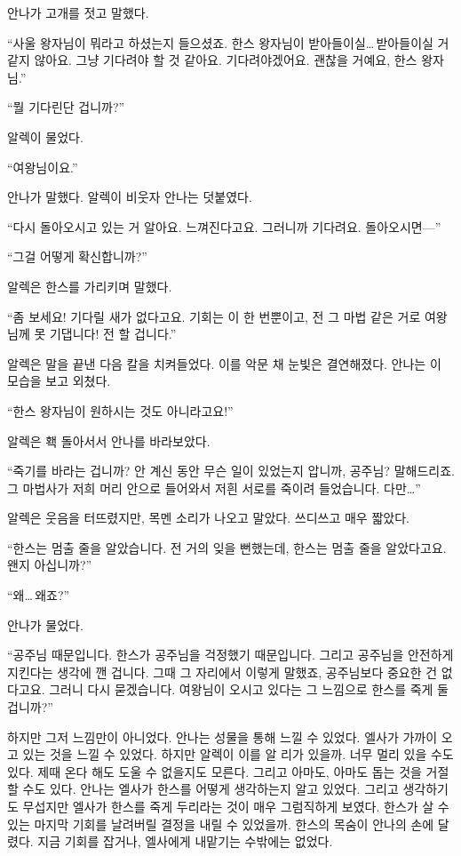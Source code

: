 안나가 고개를 젓고 말했다.

``사울 왕자님이 뭐라고 하셨는지 들으셨죠. 한스 왕자님이 받아들이실\ldots\,받아들이실 거 같지 않아요. 그냥 기다려야 할 것 같아요. 기다려야겠어요. 괜찮을 거예요, 한스 왕자님.''

``뭘 기다린단 겁니까?''

알렉이 물었다.

``여왕님이요.''

안나가 말했다. 알렉이 비웃자 안나는 덧붙였다.

``다시 돌아오시고 있는 거 알아요. 느껴진다고요. 그러니까 기다려요. 돌아오시면—''

``그걸 어떻게 확신합니까?''

알렉은 한스를 가리키며 말했다.

``좀 보세요! 기다릴 새가 없다고요. 기회는 이 한 번뿐이고, 전 그 마법 같은 거로 여왕님께 못 기댑니다! 전 할 겁니다.''

알렉은 말을 끝낸 다음 칼을 치켜들었다. 이를 악문 채 눈빛은 결연해졌다. 안나는 이 모습을 보고 외쳤다.

``한스 왕자님이 원하시는 것도 아니라고요!''

알렉은 홱 돌아서서 안나를 바라보았다.

``죽기를 바라는 겁니까? 안 계신 동안 무슨 일이 있었는지 압니까, 공주님? 말해드리죠. 그 마법사가 저희 머리 안으로 들어와서 저흰 서로를 죽이려 들었습니다. 다만\ldots''

알렉은 웃음을 터뜨렸지만, 목멘 소리가 나오고 말았다. 쓰디쓰고 매우 짧았다.

``한스는 멈출 줄을 알았습니다. 전 거의 잊을 뻔했는데, 한스는 멈출 줄을 알았다고요. 왠지 아십니까?''

``왜\ldots\,왜죠?''

안나가 물었다.

``공주님 때문입니다. 한스가 공주님을 걱정했기 때문입니다. 그리고 공주님을 안전하게 지킨다는 생각에 깬 겁니다. 그때 그 자리에서 이렇게 말했죠, 공주님보다 중요한 건 없다고요. 그러니 다시 묻겠습니다. 여왕님이 오시고 있다는 그 느낌으로 한스를 죽게 둘 겁니까?''

하지만 그저 느낌만이 아니었다. 안나는 성물을 통해 느낄 수 있었다. 엘사가 가까이 오고 있는 것을 느낄 수 있었다. 하지만 알렉이 이를 알 리가 있을까. 너무 멀리 있을 수도 있다. 제때 온다 해도 도울 수 없을지도 모른다. 그리고 아마도, 아마도 돕는 것을 거절할 수도 있다. 안나는 엘사가 한스를 어떻게 생각하는지 알고 있었다. 그리고 생각하기도 무섭지만 엘사가 한스를 죽게 두리라는 것이 매우 그럼직하게 보였다. 한스가 살 수 있는 마지막 기회를 날려버릴 결정을 내릴 수 있었을까. 한스의 목숨이 안나의 손에 달렸다. 지금 기회를 잡거나, 엘사에게 내맡기는 수밖에는 없었다.

